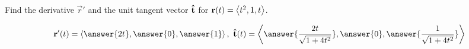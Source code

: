 \documentclass{ximera}
\author{David Guichard \and Neal Koblitz \and H. Jerome Keisler \and Albert Scheller \and Barry Balof \and Mike Wills \and Matthew Carr}
\begin{document}
\begin{exercise}



Find the derivative $\vec{r}'$ and the unit tangent vector $\mathbf{\hat{t}}$ for $\mathbf{r}(t)=\left\langle t^2,1,t\right\rangle$.

\begin{prompt}
\[
\vec{r}'(t)=\vector{\answer{2t},\answer{0},\answer{1}},\ \utan(t)=\vector{\answer{\frac{2t}{\sqrt{1+4t^2}}},\answer{0},\answer{\frac{1}{\sqrt{1+4t^2}}}}
\]
\end{prompt}


\end{exercise}
\end{document}
